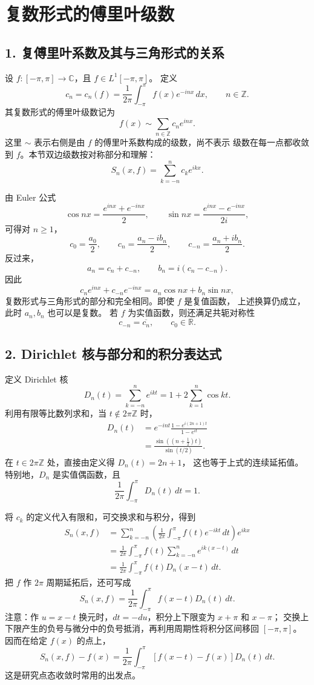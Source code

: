 \documentclass[11pt,a4paper]{ctexart}
\begin{document}
\section*{复数形式的傅里叶级数}

\subsection*{1. 复傅里叶系数及其与三角形式的关系}
设 $f:[-\pi,\pi]\to\mathbb C$，且 $f\in L^1[-\pi,\pi]$。
定义
\[
 c_n=c_n(f)=\frac{1}{2\pi}\int_{-\pi}^{\pi}f(x)e^{-inx}\,dx,
 \qquad n\in\mathbb Z.
\]
其复数形式的傅里叶级数记为
\[
 f(x)\sim\sum_{n\in\mathbb Z}c_ne^{inx}.
\]
这里 $\sim$ 表示右侧是由 $f$ 的傅里叶系数构成的级数，尚不表示
级数在每一点都收敛到 $f$。本节双边级数按对称部分和理解：
\[
 S_n(x,f)=\sum_{k=-n}^{n}c_ke^{ikx}.
\]

由 Euler 公式
\[
 \cos nx=\frac{e^{inx}+e^{-inx}}{2},\qquad
 \sin nx=\frac{e^{inx}-e^{-inx}}{2i},
\]
可得对 $n\geq1$，
\[
 c_0=\frac{a_0}{2},\qquad
 c_n=\frac{a_n-ib_n}{2},\qquad
 c_{-n}=\frac{a_n+ib_n}{2}.
\]
反过来，
\[
 a_n=c_n+c_{-n},\qquad b_n=i(c_n-c_{-n}).
\]
因此
\[
 c_ne^{inx}+c_{-n}e^{-inx}
 =a_n\cos nx+b_n\sin nx,
\]
复数形式与三角形式的部分和完全相同。即使 $f$ 是复值函数，
上述换算仍成立，此时 $a_n,b_n$ 也可以是复数。
若 $f$ 为实值函数，则还满足共轭对称性
\[
 c_{-n}=\overline{c_n},\qquad c_0\in\mathbb R.
\]

\subsection*{2. Dirichlet 核与部分和的积分表达式}
定义 Dirichlet 核
\[
 D_n(t)=\sum_{k=-n}^{n}e^{ikt}
 =1+2\sum_{k=1}^{n}\cos kt.
\]
利用有限等比数列求和，当 $t\notin2\pi\mathbb Z$ 时，
\begin{align*}
 D_n(t)
 &=e^{-int}\frac{1-e^{i(2n+1)t}}{1-e^{it}}\\
 &=\frac{\sin((n+\frac12)t)}{\sin(t/2)}.
\end{align*}
在 $t\in2\pi\mathbb Z$ 处，直接由定义得 $D_n(t)=2n+1$，
这也等于上式的连续延拓值。
特别地，$D_n$ 是实值偶函数，且
\[
 \frac{1}{2\pi}\int_{-\pi}^{\pi}D_n(t)\,dt=1.
\]

将 $c_k$ 的定义代入有限和，可交换求和与积分，得到
\begin{align*}
 S_n(x,f)
 &=\sum_{k=-n}^{n}\left(\frac{1}{2\pi}
 \int_{-\pi}^{\pi}f(t)e^{-ikt}\,dt\right)e^{ikx}\\
 &=\frac{1}{2\pi}\int_{-\pi}^{\pi}
 f(t)\sum_{k=-n}^{n}e^{ik(x-t)}\,dt\\
 &=\frac{1}{2\pi}\int_{-\pi}^{\pi}f(t)D_n(x-t)\,dt.
\end{align*}
把 $f$ 作 $2\pi$ 周期延拓后，还可写成
\[
 S_n(x,f)=\frac{1}{2\pi}\int_{-\pi}^{\pi}f(x-t)D_n(t)\,dt.
\]
注意：作 $u=x-t$ 换元时，$dt=-du$，积分上下限变为 $x+\pi$ 和 $x-\pi$；
交换上下限产生的负号与微分中的负号抵消，再利用周期性将积分区间移回 $[-\pi,\pi]$。
因而在给定 $f(x)$ 的点上，
\[
 S_n(x,f)-f(x)
 =\frac{1}{2\pi}\int_{-\pi}^{\pi}
 [f(x-t)-f(x)]D_n(t)\,dt.
\]
这是研究点态收敛时常用的出发点。
\end{document}
